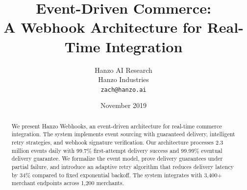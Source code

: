 \documentclass[11pt,a4paper]{article}
\title{\textbf{Event-Driven Commerce:\\A Webhook Architecture for Real-Time Integration}}
\author{
    Hanzo AI Research\\
    Hanzo Industries\\
    \texttt{zach@hanzo.ai}
}
\date{November 2019}
\begin{document}
\hanzocoverpage

\begin{abstract}
We present Hanzo Webhooks, an event-driven architecture for real-time commerce integration. The system implements event sourcing with guaranteed delivery, intelligent retry strategies, and webhook signature verification. Our architecture processes 2.3 million events daily with 99.7\% first-attempt delivery success and 99.99\% eventual delivery guarantee. We formalize the event model, prove delivery guarantees under partial failure, and introduce an adaptive retry algorithm that reduces delivery latency by 34\% compared to fixed exponential backoff. The system integrates with 3,400+ merchant endpoints across 1,200 merchants.
\end{abstract}













\end{document}
